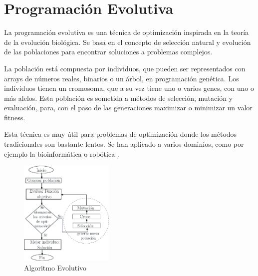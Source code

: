 \section{Programación Evolutiva}


La programación evolutiva es una técnica de optimización inspirada en la teoría de la evolución biológica. Se basa en el concepto de selección natural y evolución de las poblaciones para encontrar soluciones a problemas complejos. 

La población está compuesta por individuos, que pueden ser representados con arrays de números reales, binarios o un árbol, en programación genética. Los individuos tienen un cromosoma, que a su vez tiene uno o varios genes, con uno o más alelos. Esta población es sometida a métodos de selección, mutación y evaluación, para, con el paso de las generaciones maximizar o minimizar un valor fitness.

Esta técnica es muy útil para problemas de optimización donde los métodos tradicionales son bastante lentos.  Se han aplicado a varios dominios, como por ejemplo la bioinformática o robótica \cite{contreras2015mobile}.


\begin{figure}[!h]
	\centering
	\includegraphics[width=0.4\textwidth]{images/chapter_2/AG}
	\caption{Algoritmo Evolutivo}
	\label{fig:AG}
\end{figure}


\newpage

























